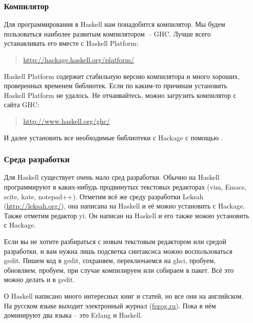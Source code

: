 

\subsubsection{Компилятор}

Для программирования в Haskell нам понадобится компилятор.
Мы будем пользоваться наиболее развитым компилятором~-- GHC. 
Лучше всего устанавливать его вместе с Haskell Platform:

\begin{quote}
\url{http://hackage.haskell.org/platform/}
\end{quote}

Haskell Platform содержит стабильную версию компилятора
и много хороших, проверенных временем библиотек. Если
по каким-то причинам установить Haskell Platform не удалось.
Не отчаивайтесь, можно загрузить компилятор с сайта GHC:

\begin{quote}
\url{http://www.haskell.org/ghc/}
\end{quote}

И далее установить все необходимые библиотеки с Hackage 
с помощью .

\subsubsection{Среда разработки}

Для Haskell существует очень мало сред разработки. Обычно
на Haskell программируют в каких-нибудь продвинутых текстовых
редакторах (vim, Emacs, scite, kate, notepad++). Отметим всё 
же среду разработки Leksah (\url{http://leksah.org/}), она 
написана на Haskell и её можно установить с Hackage. 
Также отметим редактор yi. Он написан на Haskell 
и его также можно установить с Hackage.

Если вы не хотите разбираться с новым текстовым редактором
или средой разработки, и вам нужна лишь подсветка синтаксиса
можно воспользоваться gedit. Пишем код в gedit, сохраняем,
переключаемся на ghci, пробуем, обновляем, пробуем, при
случае компилируем или собираем в пакет. Всё это можно делать
и в gedit.

\newpage



О Haskell написано много интересных книг и статей,
но все они на английском. На русском языке выходит
электронный журнал 
 (\url{fprog.ru}). Пока в нём доминируют два языка
 -- это Erlang и Haskell. 

